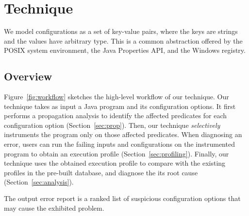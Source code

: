 \section{Technique}
\label{sec:technique}

We model configurations as a set of key-value pairs, where
the keys are strings and the values have arbitrary type. This is
a common abstraction offered
by the POSIX system environment, the Java Properties API,
and the Windows registry.


\subsection{Overview}





Figure~\ref{fig:workflow} sketches the high-level workflow of our technique.
Our technique takes as input a Java program and its configuration options.
It first performs a propagation analysis to identify
the affected predicates for each configuration option (Section~\ref{sec:prop}).
Then, our technique \textit{selectively} instruments
the program only on those affected predicates. 
When diagnosing an error, users can run the failing inputs and
configurations on the instrumented program to obtain an execution
profile (Section~\ref{sec:profiling}).
Finally, our technique uses the obtained execution profile
to compare with the existing profiles in the pre-built database,
and diagnose the its root cause (Section~\ref{sec:analysis}).

The output error report is a ranked list
of suspicious configuration options that may cause the exhibited problem.




